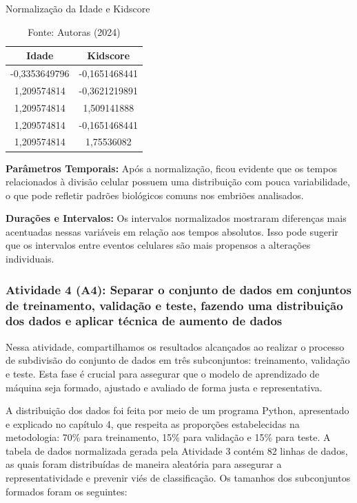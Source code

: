 \begin{table}[h!]
    \centering
    \renewcommand{\arraystretch}{1.2}
    \captionsetup{font=footnotesize, justification=centering, labelsep=period, position=above}
    \caption{Normalização da Idade e Kidscore}
    \label{tab:normalizacao-idade-kidscore}
    \begin{tabular}{|c|c|}
        \hline
        \vspace{0.2cm} \cellcolor[HTML]{008940} \textbf{Idade} & \cellcolor[HTML]{008940} \textbf{Kidscore} \\
        \hline
        -0,3353649796 & -0,1651468441 \\
        1,209574814 & -0,3621219891 \\
        1,209574814 & 1,509141888 \\
        1,209574814 & -0,1651468441 \\
        1,209574814 & 1,75536082 \\
        \hline
    \end{tabular}
    \caption*{\scriptsize Fonte: Autoras (2024)}
\end{table}
\FloatBarrier


\textbf{Parâmetros Temporais:} Após a normalização, ficou evidente que os tempos relacionados à divisão celular possuem uma distribuição com pouca variabilidade, o que pode refletir padrões biológicos comuns nos embriões analisados.

\textbf{Durações e Intervalos:} Os intervalos normalizados mostraram diferenças mais acentuadas nessas variáveis em relação aos tempos absolutos. Isso pode sugerir que os intervalos entre eventos celulares são mais propensos a alterações individuais.

\subsubsection{Atividade 4 (A4): Separar o conjunto de dados em conjuntos de treinamento, validação e teste, fazendo uma distribuição dos dados e aplicar técnica de aumento de dados}
Nessa atividade, compartilhamos os resultados alcançados ao realizar o processo de subdivisão do conjunto de dados em três subconjuntos: treinamento, validação e teste. Esta fase é crucial para assegurar que o modelo de aprendizado de máquina seja formado, ajustado e avaliado de forma justa e representativa.

A distribuição dos dados foi feita por meio de um programa Python, apresentado e explicado no capítulo 4, que respeita as proporções estabelecidas na metodologia: 70\% para treinamento, 15\% para validação e 15\% para teste. A tabela de dados normalizada gerada pela Atividade 3 contém 82 linhas de dados, as quais foram distribuídas de maneira aleatória para assegurar a representatividade e prevenir viés de classificação. Os tamanhos dos subconjuntos formados foram os seguintes:

